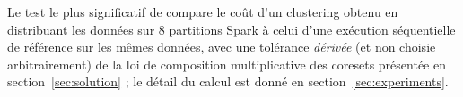 Le test le plus significatif de  compare le coût d'un
clustering obtenu en distribuant les données sur 8 partitions Spark à celui
d'une exécution séquentielle de référence sur les mêmes données, avec une
tolérance \emph{dérivée} (et non choisie arbitrairement) de la loi de
composition multiplicative des coresets présentée en
section~\ref{sec:solution} ; le détail du calcul est donné en
section~\ref{sec:experiments}.
